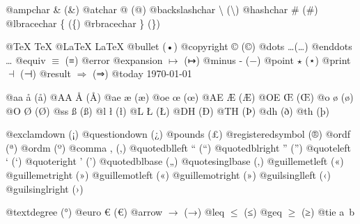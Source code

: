 \documentclass{book}
\renewcommand{\_}{\Texinfounderscore\discretionary{}{}{}}
\begin{document}
@ampchar \& (\&)
@atchar @ (@)
@backslashchar \textbackslash{} (\textbackslash{})
@hashchar \# (\#)
@lbracechar \{ (\{)
@rbracechar \} (\})

@TeX \TeX{}
@LaTeX \LaTeX{}
@bullet \textbullet{} (•)
@copyright \copyright{} (©)
@dots \dots{}\@ (…)
@enddots \dots{}
@equiv $\equiv{}$ (≡)
@error 
@expansion $\mapsto{}$ (↦)
@minus - (−)
@point $\star{}$ (⋆)
@print $\dashv{}$ (⊣)
@result $\Rightarrow{}$ (⇒)
@today \today{}

@aa \aa{} (å)
@AA \AA{} (Å)
@ae \ae{} (æ)
@oe \oe{} (œ)
@AE \AE{} (Æ)
@OE \OE{} (Œ)
@o \o{} (ø)
@O \O{} (Ø)
@ss \ss{} (ß)
@l \l{} (ł)
@L \L{} (Ł)
@DH \DH{} (Ð)
@TH \TH{} (Þ)
@dh \dh{} (ð)
@th \th{} (þ)

@exclamdown \textexclamdown{} (¡)
@questiondown \textquestiondown{} (¿)
@pounds \textsterling{} (£)
@registeredsymbol \circledR{} (®)
@ordf \textordfeminine{} (ª)
@ordm \textordmasculine{} (º)
@comma , (,)
@quotedblleft \textquotedblleft{} (“)
@quotedblright \textquotedblright{} (”)
@quoteleft \textquoteleft{} (‘)
@quoteright \textquoteright{} (’)
@quotedblbase \quotedblbase{} („)
@quotesinglbase \quotesinglbase{} (‚)
@guillemetleft \guillemotleft{} («)
@guillemetright \guillemotright{} (»)
@guillemotleft \guillemotleft{} («)
@guillemotright \guillemotright{} (»)
@guilsinglleft \guilsinglleft{} (‹)
@guilsinglright \guilsinglright{} (›)

@textdegree \textdegree{} (°)
@euro \euro{} (€)
@arrow $\rightarrow{}$ (→)
@leq $\leq{}$ (≤)
@geq $\geq{}$ (≥)
@tie a~b
\end{document}
